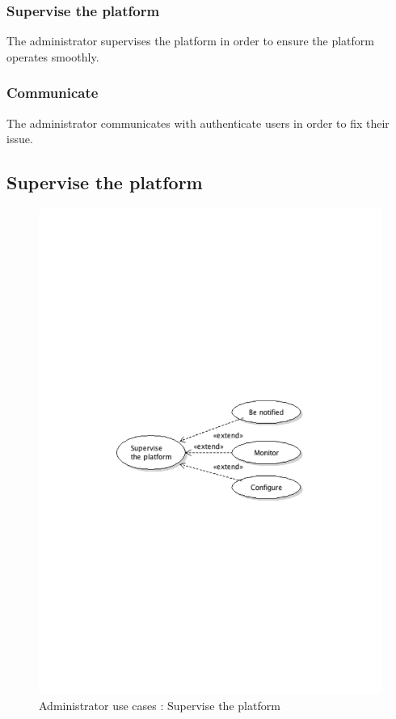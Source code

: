 		\subsubsection{Supervise the platform}
			The administrator supervises the platform in order to ensure the platform operates smoothly.
		\subsubsection{Communicate}
			The administrator communicates with authenticate users in order to fix their issue.
	\subsection{Supervise the platform}
		\begin{figure}[ht]
			\begin{center}
				\includegraphics[width=\textwidth, trim=2cm 12cm 2cm 12cm]{UML_figure/UC/administrator/UC_Administrator_Supervise.pdf}
				\caption{Administrator use cases : Supervise the platform}
			\end{center}
		\end{figure}
